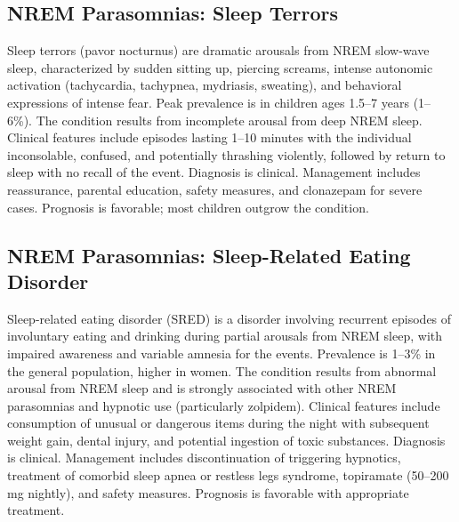 \subsection{NREM Parasomnias: Sleep Terrors}
\label{sec:Sleep Terrors}
Sleep terrors (pavor nocturnus) are dramatic arousals from NREM slow-wave sleep, characterized by sudden sitting up, piercing screams, intense autonomic activation (tachycardia, tachypnea, mydriasis, sweating), and behavioral expressions of intense fear. Peak prevalence is in children ages 1.5--7 years (1--6\%). The condition results from incomplete arousal from deep NREM sleep. Clinical features include episodes lasting 1--10 minutes with the individual inconsolable, confused, and potentially thrashing violently, followed by return to sleep with no recall of the event. Diagnosis is clinical. Management includes reassurance, parental education, safety measures, and clonazepam for severe cases. Prognosis is favorable; most children outgrow the condition.

\subsection{NREM Parasomnias: Sleep-Related Eating Disorder}
\label{sec:Sleep-Related Eating Disorder}
Sleep-related eating disorder (SRED) is a disorder involving recurrent episodes of involuntary eating and drinking during partial arousals from NREM sleep, with impaired awareness and variable amnesia for the events. Prevalence is 1--3\% in the general population, higher in women. The condition results from abnormal arousal from NREM sleep and is strongly associated with other NREM parasomnias and hypnotic use (particularly zolpidem). Clinical features include consumption of unusual or dangerous items during the night with subsequent weight gain, dental injury, and potential ingestion of toxic substances. Diagnosis is clinical. Management includes discontinuation of triggering hypnotics, treatment of comorbid sleep apnea or restless legs syndrome, topiramate (50--200 mg nightly), and safety measures. Prognosis is favorable with appropriate treatment.

